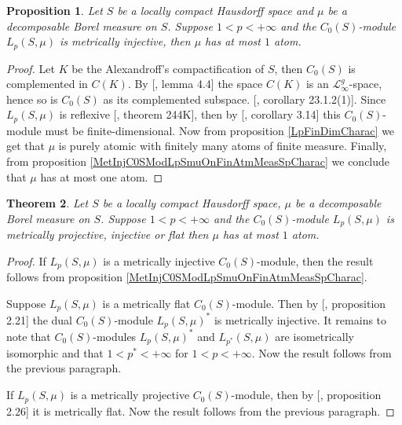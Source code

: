 \documentclass[12pt]{article}
\newtheorem{theorem}{Theorem}[section]
\newtheorem{proposition}[theorem]{Proposition}
\begin{document}
\begin{proposition}\label{MetInjC0SModLpSmuCharac}
    Let $S$ be a locally compact Hausdorff space and $\mu$ be a decomposable 
    Borel measure on $S$. Suppose $1<p<+\infty$ and 
    the $C_0(S)$-module $L_p(S,\mu)$ is metrically injective, 
    then $\mu$ has at most $1$ atom.
\end{proposition}
\begin{proof} 
    Let $K$ be the Alexandroff's compactification of $S$, then $C_0(S)$ is 
    complemented in $C(K)$. By [\cite{DefFloTensNorOpId}, lemma 4.4] the space
    $C(K)$ is an $\mathscr{L}_{\infty}^g$-space, hence so is $C_0(S)$ as its 
    complemented subspace. [\cite{DefFloTensNorOpId}, corollary 23.1.2(1)]. 
    Since $L_p(S,\mu)$ is reflexive [\cite{FremMeasTh2}, theorem 244K], then
    by [\cite{NemGeomProjInjFlatBanMod}, corollary 3.14] this $C_0(S)$-module 
    must be finite-dimensional. Now from proposition \ref{LpFinDimCharac} we 
    get that $\mu$ is purely atomic with finitely many atoms of finite measure.
    Finally, from proposition \ref{MetInjC0SModLpSmuOnFinAtmMeasSpCharac} we 
    conclude that $\mu$ has at most one atom.
\end{proof}

\begin{theorem}\label{MetInjPlotjFlatC0SModLpSmuCharac}
    Let $S$ be a locally compact Hausdorff space, $\mu$ be a decomposable 
    Borel measure on $S$. Suppose $1<p<+\infty$ and 
    the $C_0(S)$-module $L_p(S,\mu)$ is metrically projective, injective or 
    flat then $\mu$ has at most $1$ atom.
\end{theorem}
\begin{proof} 
    If $L_p(S,\mu)$ is a metrically injective $C_0(S)$-module, then the 
    result follows from proposition \ref{MetInjC0SModLpSmuOnFinAtmMeasSpCharac}. 
    
    Suppose $L_p(S,\mu)$ is a metrically flat $C_0(S)$-module. Then by 
    [\cite{NemGeomProjInjFlatBanMod}, proposition 2.21] the 
    dual $C_0(S)$-module $L_p(S,\mu)^*$ is metrically injective. 
    It remains to note that $C_0(S)$-modules $L_p(S,\mu)^*$ and $L_{p^*}(S,\mu)$ 
    are isometrically isomorphic and that $1<p^*<+\infty$ for $1<p<+\infty$. 
    Now the result follows from the previous paragraph.
    
    If $L_p(S,\mu)$ is a metrically projective $C_0(S)$-module, then by
    [\cite{NemGeomProjInjFlatBanMod}, proposition 2.26] it is metrically flat. 
    Now the result follows from the previous paragraph.
\end{proof}
\end{document}

